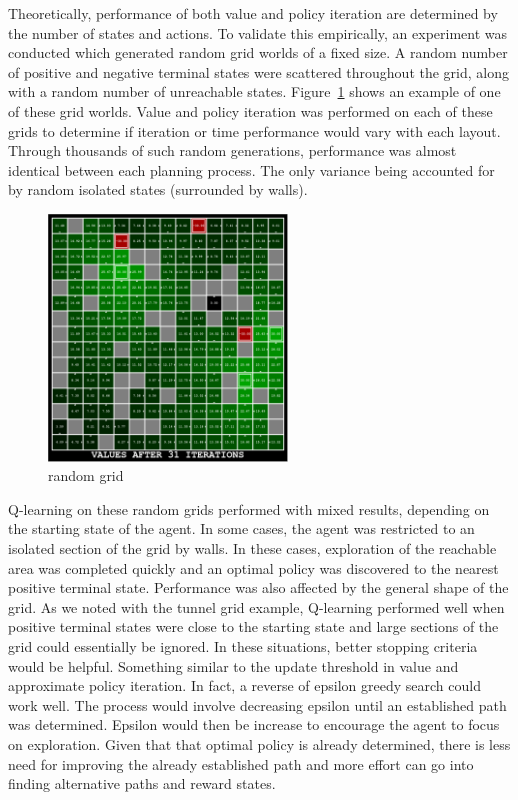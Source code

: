 \documentclass{sig-alternate}
\begin{document}
Theoretically, performance of both value and policy iteration are determined by the number of states and actions. To validate this empirically, an experiment was conducted which generated random grid worlds of a fixed size. A random number of positive and negative terminal states were scattered throughout the grid, along with a random number of unreachable states. Figure~\ref{random} shows an example of one of these grid worlds. Value and policy iteration was performed on each of these grids to determine if iteration or time performance would vary with each layout. Through thousands of such random generations, performance was almost identical between each planning process. The only variance being accounted for by random isolated states (surrounded by walls).

\begin{figure}[!htbp]
    \centering
    \includegraphics[width=2.5in]{images/random.pdf}
    \caption{random grid \label{random}}
\end{figure} 

Q-learning on these random grids performed with mixed results, depending on the starting state of the agent. In some cases, the agent was restricted to an isolated section of the grid by walls. In these cases, exploration of the reachable area was completed quickly and an optimal policy was discovered to the nearest positive terminal state. Performance was also affected by the general shape of the grid. As we noted with the tunnel grid example, Q-learning performed well when positive terminal states were close to the starting state and large sections of the grid could essentially be ignored. In these situations, better stopping criteria would be helpful. Something similar to the update threshold in value and approximate policy iteration. In fact, a reverse of epsilon greedy search could work well. The process would involve decreasing epsilon until an established path was determined. Epsilon would then be increase to encourage the agent to focus on exploration. Given that that optimal policy is already determined, there is less need for improving the already established path and more effort can go into finding alternative paths and reward states.




\end{document}
